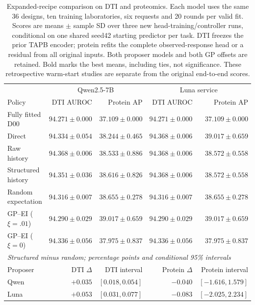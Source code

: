 \begin{table}[htbp]
\centering\footnotesize
\setlength{\tabcolsep}{3pt}
\caption{Expanded-recipe comparison on DTI and proteomics. Each model uses the same 36 designs, ten training laboratories, six requests and 20 rounds per valid fit. Scores are means $\pm$ sample SD over three new head-training/controller runs, conditional on one shared seed42 starting predictor per task. DTI freezes the prior TAPB encoder; protein refits the complete observed-response head or a residual from all original inputs. Both proposer models and both GP offsets are retained. Bold marks the best means, including ties, not significance. These retrospective warm-start studies are separate from the original end-to-end scores.}
\label{tab:expanded-recipe-results}
\begin{tabular}{lrrrr}
\toprule
 & \multicolumn{2}{c}{Qwen2.5-7B} & \multicolumn{2}{c}{Luna service} \\
Policy & DTI AUROC & Protein AP & DTI AUROC & Protein AP \\
\midrule
Fully fitted D00 & $94.271 \pm 0.000$ & $37.109 \pm 0.000$ & $94.271 \pm 0.000$ & $37.109 \pm 0.000$ \\
Direct & $94.334 \pm 0.054$ & $38.244 \pm 0.465$ & $\mathbf{94.368 \pm 0.006}$ & $\mathbf{39.017 \pm 0.659}$ \\
Raw history & $\mathbf{94.368 \pm 0.006}$ & $38.533 \pm 0.886$ & $\mathbf{94.368 \pm 0.006}$ & $38.572 \pm 0.558$ \\
Structured history & $94.351 \pm 0.036$ & $38.616 \pm 0.826$ & $\mathbf{94.368 \pm 0.006}$ & $38.572 \pm 0.558$ \\
Random expectation & $94.316 \pm 0.007$ & $38.655 \pm 0.278$ & $94.316 \pm 0.007$ & $38.655 \pm 0.278$ \\
GP--EI ($\xi=.01$) & $94.290 \pm 0.029$ & $\mathbf{39.017 \pm 0.659}$ & $94.290 \pm 0.029$ & $\mathbf{39.017 \pm 0.659}$ \\
GP--EI ($\xi=0$) & $94.336 \pm 0.056$ & $37.975 \pm 0.837$ & $94.336 \pm 0.056$ & $37.975 \pm 0.837$ \\
\midrule
\multicolumn{5}{l}{\textit{Structured minus random; percentage points and conditional 95\% intervals}} \\
Proposer & DTI $\Delta$ & DTI interval & Protein $\Delta$ & Protein interval \\
Qwen & $+0.035$ & $[0.018, 0.054]$ & $-0.040$ & $[-1.616, 1.579]$ \\
Luna & $+0.053$ & $[0.031, 0.077]$ & $-0.083$ & $[-2.025, 2.234]$ \\
\bottomrule
\end{tabular}
\end{table}
